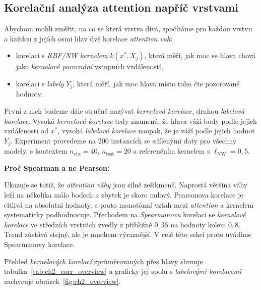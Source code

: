 \subsection{Korelační analýza attention napříč vrstvami}
\label{subsec:ch2-korelace}

Abychom mohli změřit, na co se která vrstva dívá, spočítáme pro každou vrstvu a každou z jejích osmi hlav dvě korelace \emph{attention vah}:
\begin{itemize}
    \item korelaci s \textit{RBF/NW kernelem} $k(x^*, X_j)$, která měří, jak moc se hlava chová jako \emph{kernelové porovnání} vstupních vzdáleností,
    \item korelaci s \textit{labely} $Y_j$, která měří, jak moc hlava místo toho čte pozorované hodnoty.
\end{itemize}
První z nich budeme dále stručně nazývat \textit{kernelová korelace}, druhou \textit{labelová korelace}.
Vysoká \emph{kernelová korelace} tedy znamená, že hlava váží body podle jejich vzdálenosti od $x^*$, vysoká \emph{labelová korelace} naopak, že je váží podle jejich hodnot $Y_j$.
Experiment provedeme na $200$ instancích se sdílenými daty pro všechny modely, s kontextem $n_{\text{ctx}} = 40$, $n_{\text{test}} = 20$ a referenčním kernelem s $\ell_{\text{NW}} = 0{,}5$.
\par

\textbf{Proč Spearman a ne Pearson:}

Ukazuje se totiž, že \emph{attention váhy} jsou silně zešikmené.
Naprostá většina váhy leží na několika málo bodech a zbytek je skoro nulový.
Pearsonova korelace je citlivá na absolutní hodnoty, a proto monotónní vztah mezi \emph{attention} a kernelem systematicky podhodnocuje.
Přechodem na \textit{Spearmanovu} korelaci se \emph{kernelové korelace} ve středních vrstvách zvedly z přibližně $0{,}35$ na hodnoty kolem $0{,}8$.
Trend zůstává stejný, ale je mnohem výraznější.
V celé této sekci proto uvádíme Spearmanovy korelace.
\par

Přehled \emph{kernelových korelací} zprůměrovaných přes hlavy shrnuje tabulka~\ref{tab:ch2_corr_overview} a graficky jej spolu s \emph{labelovými korelacemi} zachycuje obrázek~\ref{fig:ch2_overview}.

